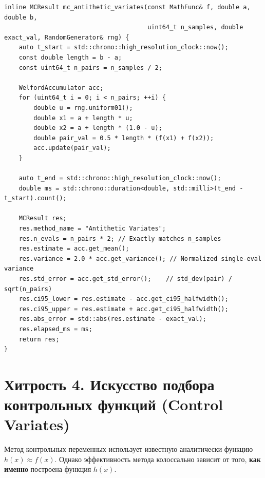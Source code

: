 \documentclass[11pt,a4paper]{article}
\begin{document}
\begin{lstlisting}
inline MCResult mc_antithetic_variates(const MathFunc& f, double a, double b,
                                       uint64_t n_samples, double exact_val, RandomGenerator& rng) {
    auto t_start = std::chrono::high_resolution_clock::now();
    const double length = b - a;
    const uint64_t n_pairs = n_samples / 2;

    WelfordAccumulator acc;
    for (uint64_t i = 0; i < n_pairs; ++i) {
        double u = rng.uniform01();
        double x1 = a + length * u;
        double x2 = a + length * (1.0 - u);
        double pair_val = 0.5 * length * (f(x1) + f(x2));
        acc.update(pair_val);
    }

    auto t_end = std::chrono::high_resolution_clock::now();
    double ms = std::chrono::duration<double, std::milli>(t_end - t_start).count();

    MCResult res;
    res.method_name = "Antithetic Variates";
    res.n_evals = n_pairs * 2; // Exactly matches n_samples
    res.estimate = acc.get_mean();
    res.variance = 2.0 * acc.get_variance(); // Normalized single-eval variance
    res.std_error = acc.get_std_error();    // std_dev(pair) / sqrt(n_pairs)
    res.ci95_lower = res.estimate - acc.get_ci95_halfwidth();
    res.ci95_upper = res.estimate + acc.get_ci95_halfwidth();
    res.abs_error = std::abs(res.estimate - exact_val);
    res.elapsed_ms = ms;
    return res;
}
\end{lstlisting}

\newpage

\section{Хитрость 4. Искусство подбора контрольных функций (Control Variates)}

Метод контрольных переменных использует известную аналитически функцию $h(x) \approx f(x)$. Однако эффективность метода колоссально зависит от того, \textbf{как именно} построена функция $h(x)$.
\end{document}
